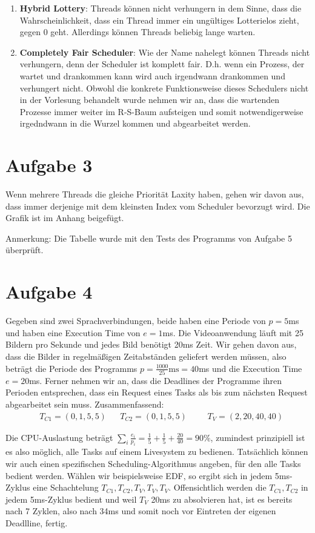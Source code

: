\documentclass[numbers=noendperiod,10pt]{scrartcl}
\begin{document}
\begin{enumerate}
	\item \textbf{Hybrid Lottery}: Threads können nicht verhungern in dem Sinne, dass die Wahrscheinlichkeit, dass ein Thread immer ein ungültiges Lotterielos zieht, gegen 0 geht. Allerdings können Threads beliebig lange warten.
	
	\item \textbf{Completely Fair Scheduler}: Wie der Name nahelegt können Threads nicht verhungern, denn der Scheduler ist komplett fair. D.h. wenn ein Prozess, der wartet und drankommen kann wird auch irgendwann drankommen und verhungert nicht. Obwohl die konkrete Funktionsweise dieses Schedulers nicht in der Vorlesung behandelt wurde nehmen wir an, dass die wartenden Prozesse immer weiter im R-S-Baum aufsteigen und somit notwendigerweise irgedndwann in die Wurzel kommen und abgearbeitet werden.
\end{enumerate}

\section*{Aufgabe 3}

Wenn mehrere Threads die gleiche Priorität Laxity haben, gehen wir davon aus, dass immer derjenige mit dem kleinsten Index vom Scheduler bevorzugt wird. Die Grafik ist im Anhang beigefügt.

Anmerkung: Die Tabelle wurde mit den Tests des Programms von Aufgabe 5 überprüft.

\section*{Aufgabe 4}

Gegeben sind zwei Sprachverbindungen, beide haben eine Periode von $p= 5$ms und haben eine Execution Time von $e = 1$ms. Die Videoanwendung läuft mit 25 Bildern pro Sekunde und jedes Bild benötigt 20ms Zeit. Wir gehen davon aus, dass die Bilder in regelmäßigen Zeitabständen geliefert werden müssen, also beträgt die Periode des Programms $p = \frac{1000}{25}\text{ms} = 40$ms und die Execution Time $e = 20$ms. Ferner nehmen wir an, dass die Deadlines der Programme ihren Perioden entsprechen, dass ein Request eines Tasks als bis zum nächsten Request abgearbeitet sein muss. Zusammenfassend:
\begin{align}
	&T_{C1} = (0,1,5,5) &&T_{C2} = (0,1,5,5) &&&T_V = (2,20,40,40)
\end{align}

Die CPU-Auslastung beträgt $\sum_{i} \frac{e_i}{p_i} = \frac{1}{5} + \frac{1}{5} +  \frac{20}{40} = 90\%$, zumindest prinzipiell ist es also möglich, alle Tasks auf einem Livesystem zu bedienen. Tatsächlich können wir auch einen spezifischen Scheduling-Algorithmus angeben, für den alle Tasks bedient werden. Wählen wir beispielsweise  EDF, so ergibt sich in jedem 5ms-Zyklus eine Schachtelung $T_{C1}, T_{C2}, T_V, T_V, T_V$. Offensichtlich werden die $T_{C1}, T_{C2}$ in jedem 5ms-Zyklus bedient und weil $T_V$ 20ms zu absolvieren hat, ist es bereits nach 7 Zyklen, also nach 34ms und somit noch vor Eintreten der eigenen Deadlline, fertig.
\end{document}
